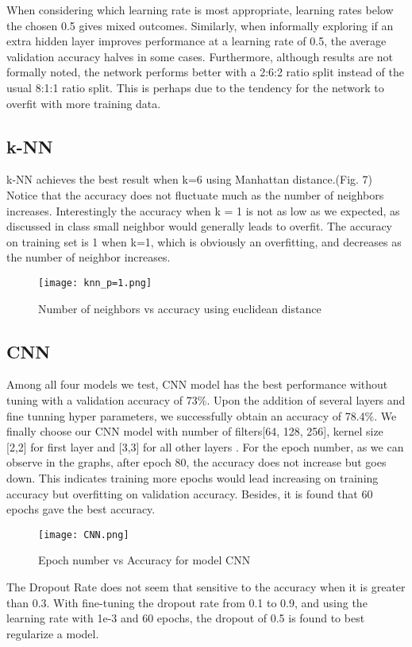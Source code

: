 \documentclass[conference]{IEEEtran}
\begin{document}
When considering which learning rate is most appropriate, learning rates below the chosen 0.5 gives mixed outcomes. Similarly, when informally exploring if an extra hidden layer improves performance at a learning rate of 0.5, the average validation accuracy halves in some cases. Furthermore, although results are not formally noted, the network performs better with a 2:6:2 ratio split instead of the usual 8:1:1 ratio split. This is perhaps due to the tendency for the network to overfit with more training data.

\subsection{k-NN}
k-NN achieves the best result when k=6 using Manhattan distance.(Fig. 7) Notice that the accuracy does not fluctuate much as the number of neighbors increases. Interestingly the accuracy when k = 1 is not as low as we expected, as discussed in class small neighbor would generally leads to overfit. The accuracy on training set is 1 when k=1, which is obviously an overfitting, and decreases as the number of neighbor increases.
\begin{figure}[!htbp]
\centering
\texttt{[image: knn\_p=1.png]}
\caption{Number of neighbors vs accuracy using euclidean distance}
\end{figure}


\subsection{CNN}
Among all four models we test, CNN model has the best performance without tuning with a validation accuracy of 73\%. Upon the addition of several layers and fine tunning hyper parameters, we successfully obtain an accuracy of 78.4\%. We finally choose our CNN model with number of filters[64, 128, 256], kernel size [2,2] for first layer and [3,3] for all other layers . For the epoch number, as we can observe in the graphs, after epoch 80, the accuracy does not increase but goes down. This indicates training more epochs would lead increasing on training accuracy but overfitting on validation accuracy. Besides, it is found that 60 epochs gave the best accuracy.
\begin{figure}[!htbp]
\centering
\texttt{[image: CNN.png]}
\caption{Epoch number vs Accuracy for model CNN}
\end{figure}

The Dropout Rate does not seem that sensitive to the accuracy when it is greater than 0.3. With fine-tuning the dropout rate from 0.1 to 0.9, and using the learning rate with 1e-3 and 60 epochs, the dropout of 0.5 is found to best regularize a model.
\end{document}
